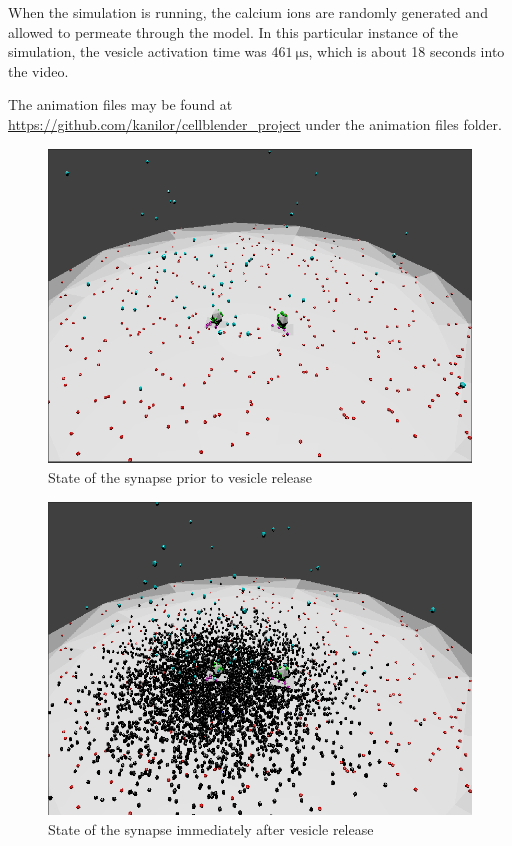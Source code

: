 \documentclass[a4paper]{article}
\begin{document}
When the simulation is running, the calcium ions are randomly generated and allowed to permeate through the model. In this particular instance of the simulation, the vesicle activation time was $\SI{461}{\micro\second}$, which is about 18 seconds into the video.

The animation files may be found at \url{https://github.com/kanilor/cellblender_project} under the animation files folder.

\begin{figure}[H]
   \centering
   \includegraphics[scale = 0.4]{fig1.png} %
   \caption{State of the synapse prior to vesicle release}
   \label{fig1}
\end{figure}

\begin{figure}[H]
   \centering
   \includegraphics[scale = 0.4]{fig2.png} %
   \caption{State of the synapse immediately after vesicle release}
   \label{fig2}
\end{figure}
\end{document}
